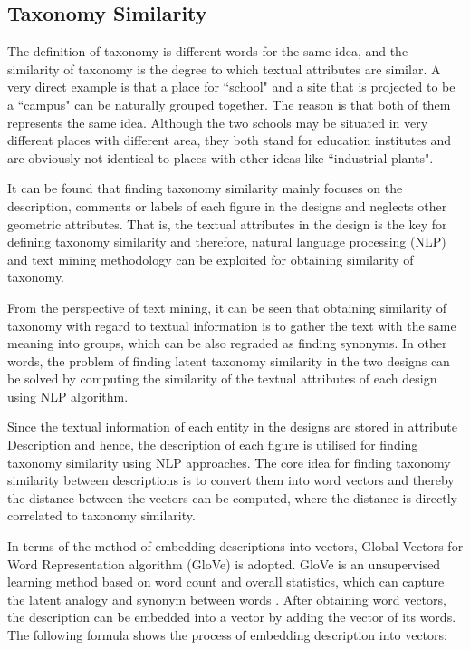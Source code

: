\subsection*{Taxonomy Similarity}
The definition of taxonomy is different words for the same idea, and the similarity of taxonomy is the degree to which textual attributes are similar. A very direct example is that a place for ``school" and a site that is projected to be a ``campus" can be naturally grouped together. The reason is that both of them represents the same idea. Although the two schools may be situated in very different places with different area, they both stand for education institutes and are obviously not identical to places with other ideas like ``industrial plants".
\par
It can be found that finding taxonomy similarity mainly focuses on the description, comments or labels of each figure in the designs and neglects other geometric attributes. That is, the textual attributes in the design is the key for defining taxonomy similarity and therefore, natural language processing (NLP) and text mining methodology can be exploited for obtaining similarity of taxonomy.
\par
From the perspective of text mining, it can be seen that obtaining similarity of taxonomy with regard to textual information is to gather the text with the same meaning into groups, which can be also regraded as finding synonyms. In other words, the problem of finding latent taxonomy similarity in the two designs can be solved by computing the similarity of the textual attributes of each design using NLP algorithm.
\par
Since the textual information of each entity in the designs are stored in attribute Description and hence, the description of each figure is utilised for finding taxonomy similarity using NLP approaches. The core idea for finding taxonomy similarity between descriptions is to convert them into word vectors and thereby the distance between the vectors can be computed, where the distance is directly correlated to taxonomy similarity.
\par
In terms of the method of embedding descriptions into vectors, Global Vectors for Word Representation algorithm (GloVe) is adopted. GloVe is an unsupervised learning method based on word count and overall statistics, which can capture the latent analogy and synonym between words \cite{pennington2014glove}. After obtaining word vectors, the description can be embedded into a vector by adding the vector of its words. The following formula shows the process of embedding description into vectors:
